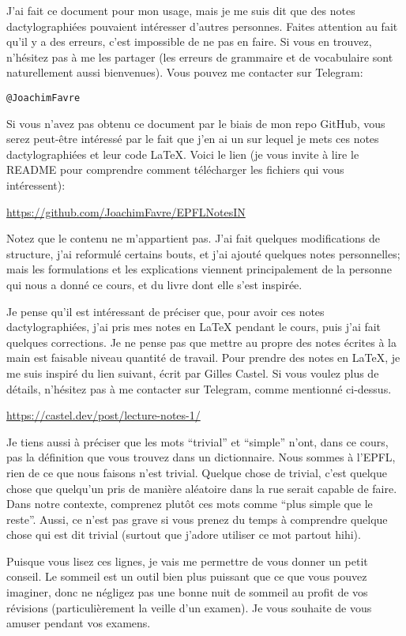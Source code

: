J'ai fait ce document pour mon usage, mais je me suis dit que des notes dactylographiées pouvaient intéresser d'autres personnes. Faites attention au fait qu'il y a des erreurs, c'est impossible de ne pas en faire. Si vous en trouvez, n'hésitez pas à me les partager (les erreurs de grammaire et de vocabulaire sont naturellement aussi bienvenues). Vous pouvez me contacter sur Telegram:
\begin{center}
    \texttt{@JoachimFavre}
\end{center}

Si vous n'avez pas obtenu ce document par le biais de mon repo GitHub, vous serez peut-être intéressé par le fait que j'en ai un sur lequel je mets ces notes dactylographiées et leur code \LaTeX{}. Voici le lien (je vous invite à lire le README pour comprendre comment télécharger les fichiers qui vous intéressent):
\begin{center}
    \url{https://github.com/JoachimFavre/EPFLNotesIN}
\end{center}

Notez que le contenu ne m'appartient pas. J'ai fait quelques modifications de structure, j'ai reformulé certains bouts, et j'ai ajouté quelques notes personnelles; mais les formulations et les explications viennent principalement de la personne qui nous a donné ce cours, et du livre dont elle s'est inspirée.

Je pense qu'il est intéressant de préciser que, pour avoir ces notes dactylographiées, j'ai pris mes notes en \LaTeX{} pendant le cours, puis j'ai fait quelques corrections. Je ne pense pas que mettre au propre des notes écrites à la main est faisable niveau quantité de travail. Pour prendre des notes en \LaTeX{}, je me suis inspiré du lien suivant, écrit par Gilles Castel. Si vous voulez plus de détails, n'hésitez pas à me contacter sur Telegram, comme mentionné ci-dessus.
\begin{center}
    \url{https://castel.dev/post/lecture-notes-1/}
\end{center}

Je tiens aussi à préciser que les mots ``trivial'' et ``simple'' n'ont, dans ce cours, pas la définition que vous trouvez dans un dictionnaire. Nous sommes à l'EPFL, rien de ce que nous faisons n'est trivial. Quelque chose de trivial, c'est quelque chose que quelqu'un pris de manière aléatoire dans la rue serait capable de faire. Dans notre contexte, comprenez plutôt ces mots comme ``plus simple que le reste''. Aussi, ce n'est pas grave si vous prenez du temps à comprendre quelque chose qui est dit trivial (surtout que j'adore utiliser ce mot partout hihi).

Puisque vous lisez ces lignes, je vais me permettre de vous donner un petit conseil. Le sommeil est un outil bien plus puissant que ce que vous pouvez imaginer, donc ne négligez pas une bonne nuit de sommeil au profit de vos révisions (particulièrement la veille d'un examen). Je vous souhaite de vous amuser pendant vos examens.
